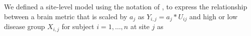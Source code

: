 We defined a site-level model using the notation of \cite{Raudenbush2000}, to express the relationship between a brain metric that is scaled by $a_j$ as $Y_{i,j} = a_j*U_{ij}$ and high or low disease group $X_{i,j}$ for subject $i=1,\ldots,n$ at site $j$  as 
